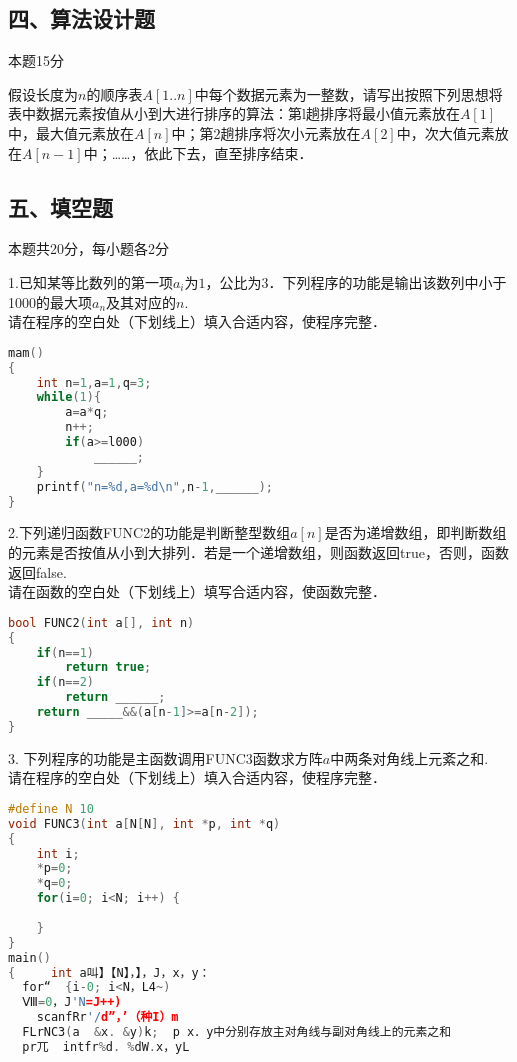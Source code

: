 \subsection{四、算法设计题}

本题15分

  假设长度为$n$的顺序表$A[1..n]$中每个数据元素为一整数，请写出按照下列思想将表中数据元素按值从小到大进行排序的算法：第l趟排序将最小值元素放在$A[1]$中，最大值元素放在$A[n]$中；第$2$趟排序将次小元素放在$A[2]$中，次大值元素放在$A[n-1]$中；……，依此下去，直至排序结束．


\subsection{五、填空题}

本题共20分，每小题各2分

1.已知某等比数列的第一项$a_i$为$1$，公比为$3$．下列程序的功能是输出该数列中小于1000的最大项$a_n$及其对应的$n$. \\
请在程序的空白处（下划线上）填入合适内容，使程序完整．
\begin{lstlisting}[language=cpp]
mam()
{
    int n=1,a=1,q=3;
    while(1){
        a=a*q;
        n++;
        if(a>=l000)
            ______;
    }
    printf("n=%d,a=%d\n",n-1,______);
}
\end{lstlisting}

2.下列递归函数FUNC2的功能是判断整型数组$a[n]$是否为递增数组，即判断数组的元素是否按值从小到大排列．若是一个递增数组，则函数返回true，否则，函数返回false. \\
请在函数的空白处（下划线上）填写合适内容，使函数完整．
\begin{lstlisting}[language=cpp]
bool FUNC2(int a[], int n)
{
    if(n==1)
        return true;
    if(n==2)
        return ______;
    return _____&&(a[n-1]>=a[n-2]);
}


\end{lstlisting}

3. 下列程序的功能是主函数调用FUNC3函数求方阵$a$中两条对角线上元紊之和. \\
请在程序的空白处（下划线上）填入合适内容，使程序完整．
\begin{lstlisting}[language=cpp]
#define N 10
void FUNC3(int a[N[N], int *p, int *q)
{
    int i;
    *p=0;
    *q=0;
    for(i=0; i<N; i++) {
        
    }
}
main()
{     int a叫】【N】，】，J，x，y：
  for“  {i-0; i<N，L4~)
  Ⅷ=0，J'N=J++)
    scanfRr'/d”，’（种I）m
  FLrNC3(a  &x. &y)k;  p x．y中分别存放主对角线与副对角线上的元素之和
  pr兀  intfr%d. %dW.x，yL

\end{lstlisting}